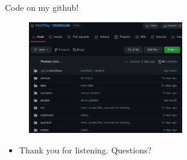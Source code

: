\documentclass{beamer}
\begin{document}
\begin{frame}{Code on my github!}
	\begin{figure}
		\includegraphics[width=0.6\textwidth]{github.png}
	\end{figure}
	\begin{itemize}
		\item Thank you for listening. Questions?
	\end{itemize}
\end{frame}
\end{document}
